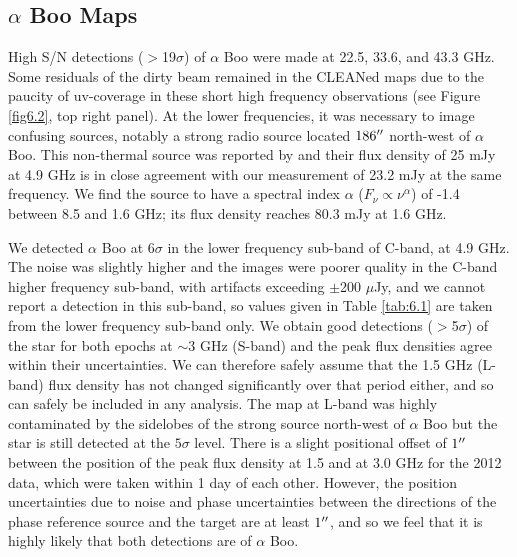 \subsection{$\alpha$ Boo Maps}\label{sec:6.2.1}
High S/N detections ($>$19$\sigma$) of $\alpha$ Boo were made at 22.5, 33.6, and 43.3 GHz. Some residuals of the dirty beam remained in the CLEANed maps due to the paucity of uv-coverage in these short high frequency observations (see Figure \ref{fig6.2}, top right panel). At the lower frequencies, it was necessary to image confusing sources, notably a strong radio source located $186^{\prime\prime}$ north-west of $\alpha$ Boo. This non-thermal source was reported by \cite{drake_1983} and their flux density of 25 mJy at 4.9 GHz is in close agreement with our measurement of 23.2 mJy at the same frequency. We find the source to have a spectral index $\alpha$ ($F_{\nu} \propto \nu ^{\alpha}$) of -1.4 between 8.5 and 1.6 GHz; its flux density reaches 80.3 mJy at 1.6 GHz.

We detected $\alpha$ Boo at 6$\sigma$ in the lower frequency sub-band of C-band, at 4.9 GHz. The noise was slightly higher and the images were poorer quality in the C-band higher frequency sub-band, with artifacts exceeding $\pm$200 $\mu$Jy, and we cannot report a detection in this sub-band, so values given in Table \ref{tab:6.1} are taken from the lower frequency sub-band only. We obtain good detections ($>$5$\sigma$) of the star for both epochs at $\sim 3$ GHz (S-band) and the peak flux densities agree within their uncertainties. We can therefore safely assume that the 1.5 GHz (L-band) flux density has not changed significantly over that period either, and so can safely be included in any analysis. The map at L-band was highly contaminated by the sidelobes of the strong source north-west of $\alpha$ Boo but the star is still detected at the $5\sigma$ level. There is a slight positional offset of $1^{\prime\prime}$ between the position of the peak flux density at 1.5 and at 3.0 GHz for the 2012 data, which were taken within 1 day of each other. However, the position uncertainties due to noise and phase uncertainties between the directions of the phase reference source and the target are at least $1^{\prime\prime}$, and so we feel that it is highly likely that both detections are of $\alpha$ Boo.

